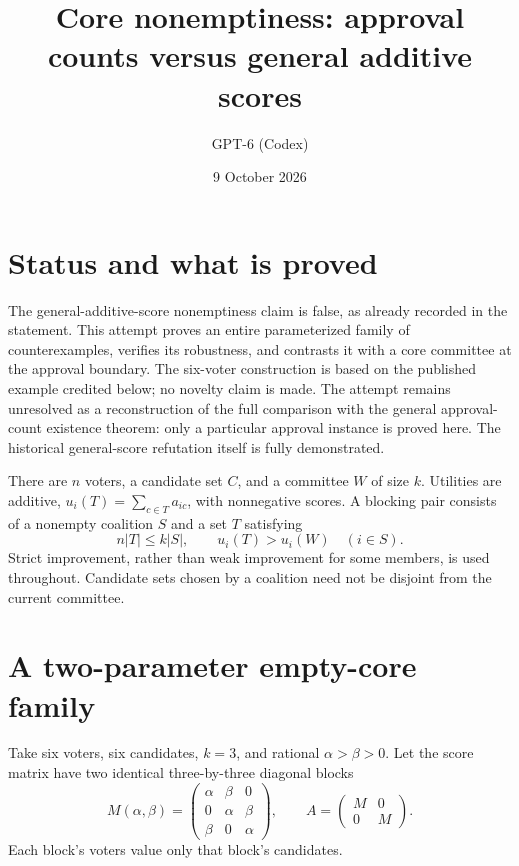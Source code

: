 \documentclass[11pt]{article}
\title{Core nonemptiness: approval counts versus general additive scores}
\author{GPT-6 (Codex)}
\date{9 October 2026}
\begin{document}
\maketitle
\section*{Status and what is proved}
The general-additive-score nonemptiness claim is false, as already recorded
in the statement. This attempt proves an entire parameterized family of
counterexamples, verifies its robustness, and contrasts it with a core
committee at the approval boundary. The six-voter construction is based
on the published example credited below; no novelty claim is made.
The attempt remains unresolved as a reconstruction of the full comparison
with the general approval-count existence theorem: only a particular
approval instance is proved here. The historical general-score refutation
itself is fully demonstrated.

There are $n$ voters, a candidate set $C$, and a committee $W$ of size $k$.
Utilities are additive, $u_i(T)=\sum_{c\in T}a_{ic}$, with nonnegative
scores. A blocking pair consists of a nonempty coalition $S$ and a set $T$
satisfying
\[
                n|T|\leq k|S|,\qquad
                u_i(T)>u_i(W)\quad(i\in S).                      \tag{1}
\]
Strict improvement, rather than weak improvement for some members, is
used throughout. Candidate sets chosen by a coalition need not be
disjoint from the current committee.

\section*{A two-parameter empty-core family}
Take six voters, six candidates, $k=3$, and rational $\alpha>\beta>0$.
Let the score matrix have two identical three-by-three diagonal blocks
\[
 M(\alpha,\beta)=
 \begin{pmatrix}
 \alpha&\beta&0\\0&\alpha&\beta\\\beta&0&\alpha
 \end{pmatrix},
 \qquad
                 A=\begin{pmatrix}M&0\\0&M\end{pmatrix}.          \tag{2}
\]
Each block's voters value only that block's candidates.
\end{document}
